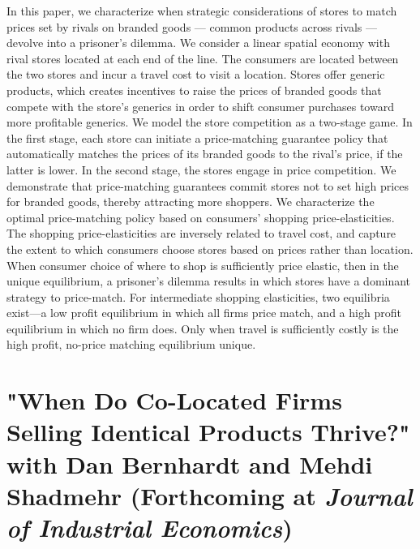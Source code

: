 \documentclass[12pt]{article}
\begin{document}
\noindent In this paper, we characterize when strategic considerations of stores to match prices set by rivals on branded goods --- common products across rivals --- devolve into a prisoner’s dilemma.
We consider a linear spatial economy with rival stores located at each end of the line.
The consumers are located between the two stores and incur a travel cost to visit a location.
Stores offer generic products, which creates incentives to raise the prices of branded goods that compete with the store's generics in order to shift consumer purchases toward more profitable generics.
We model the store competition as a two-stage game.
In the first stage, each store can initiate a price-matching guarantee policy that automatically matches the prices of its branded goods to the rival's price, if the latter is lower.
In the second stage, the stores engage in price competition.
We demonstrate that price-matching guarantees commit stores not to set high prices for branded goods, thereby attracting more shoppers.
We characterize the optimal price-matching policy based on consumers' shopping price-elasticities.
The shopping price-elasticities are inversely related to travel cost, and capture the extent to which consumers choose stores based on prices rather than location.
When consumer choice of where to shop is sufficiently price elastic, then in the unique equilibrium, a prisoner’s dilemma results in which stores have a dominant strategy to price-match.
For intermediate shopping elasticities, two equilibria exist—a low profit equilibrium in which all firms price match, and a high profit equilibrium in which no firm does.
Only when travel is sufficiently costly is the high profit, no-price matching equilibrium unique.

\vspace{0.35cm}
\section{"When Do Co-Located Firms Selling Identical Products Thrive?" with Dan Bernhardt and Mehdi Shadmehr (Forthcoming at \emph{Journal of Industrial Economics})}
\label{sec:orgbe3f36e}
\vspace{0.15cm}
\end{document}
